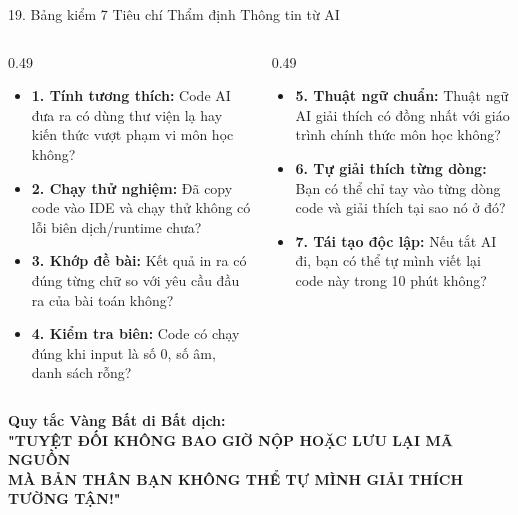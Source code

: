 \documentclass[aspectratio=169, 10pt]{beamer}
\begin{document}
\begin{frame}{19. Bảng kiểm 7 Tiêu chí Thẩm định Thông tin từ AI}
  \begin{columns}[T]
    \begin{column}{0.49\textwidth}
      \footnotesize
      \begin{itemize}\setlength{\itemsep}{3pt}
        \item[$\square$] \textbf{1. Tính tương thích:} Code AI đưa ra có dùng thư viện lạ hay kiến thức vượt phạm vi môn học không?
        \item[$\square$] \textbf{2. Chạy thử nghiệm:} Đã copy code vào IDE và chạy thử không có lỗi biên dịch/runtime chưa?
        \item[$\square$] \textbf{3. Khớp đề bài:} Kết quả in ra có đúng từng chữ so với yêu cầu đầu ra của bài toán không?
        \item[$\square$] \textbf{4. Kiểm tra biên:} Code có chạy đúng khi input là số 0, số âm, danh sách rỗng?
      \end{itemize}
    \end{column}
    \begin{column}{0.49\textwidth}
      \footnotesize
      \begin{itemize}\setlength{\itemsep}{3pt}
        \item[$\square$] \textbf{5. Thuật ngữ chuẩn:} Thuật ngữ AI giải thích có đồng nhất với giáo trình chính thức môn học không?
        \item[$\square$] \textbf{6. Tự giải thích từng dòng:} Bạn có thể chỉ tay vào từng dòng code và giải thích tại sao nó ở đó?
        \item[$\square$] \textbf{7. Tái tạo độc lập:} Nếu tắt AI đi, bạn có thể tự mình viết lại code này trong 10 phút không?
      \end{itemize}
    \end{column}
  \end{columns}
  \vspace{0.15cm}
  \begin{tcolorbox}[colback=accentorange!15, colframe=accentorange, arc=3pt, left=8pt, right=8pt, top=3pt, bottom=3pt]
    \centering\footnotesize
    \textbf{Quy tắc Vàng Bất di Bất dịch:}\\[2pt]
    \textbf{"TUYỆT ĐỐI KHÔNG BAO GIỜ NỘP HOẶC LƯU LẠI MÃ NGUỒN\\MÀ BẢN THÂN BẠN KHÔNG THỂ TỰ MÌNH GIẢI THÍCH TƯỜNG TẬN!"}
  \end{tcolorbox}
\end{frame}
\end{document}
